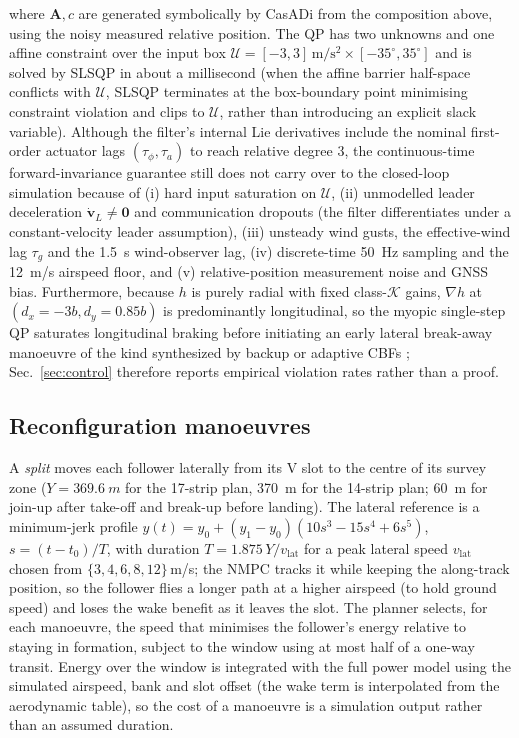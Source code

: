 where $\mathbf A,c$ are generated symbolically by CasADi from the composition above, using the noisy measured relative position. The QP has two unknowns and one affine constraint over the input box $\mathcal U=[-3,3]\,\mathrm{m/s^2}\times[-35^\circ,35^\circ]$ and is solved by SLSQP in about a millisecond (when the affine barrier half-space conflicts with $\mathcal U$, SLSQP terminates at the box-boundary point minimising constraint violation and clips to $\mathcal U$, rather than introducing an explicit slack variable). Although the filter's internal Lie derivatives include the nominal first-order actuator lags $(\tau_\phi,\tau_a)$ to reach relative degree $3$, the continuous-time forward-invariance guarantee still does not carry over to the closed-loop simulation because of (i) hard input saturation on $\mathcal U$, (ii) unmodelled leader deceleration $\dot{\mathbf v}_L\ne\mathbf 0$ and communication dropouts (the filter differentiates under a constant-velocity leader assumption), (iii) unsteady wind gusts, the effective-wind lag $\tau_g$ and the \SI{1.5}{s} wind-observer lag, (iv) discrete-time \SI{50}{Hz} sampling and the \SI{12}{m/s} airspeed floor, and (v) relative-position measurement noise and GNSS bias. Furthermore, because $h$ is purely radial with fixed class-$\mathcal K$ gains, $\nabla h$ at $(d_x=-3b,d_y=0.85b)$ is predominantly longitudinal, so the myopic single-step QP saturates longitudinal braking before initiating an early lateral break-away manoeuvre of the kind synthesized by backup or adaptive CBFs \cite{chen2021backup,xiao2021ada,molnar2025}; Sec.~\ref{sec:control} therefore reports empirical violation rates rather than a proof.

\subsection{Reconfiguration manoeuvres}\label{sec:reconfdesign}
A \emph{split} moves each follower laterally from its V slot to the centre of its survey zone ($Y=\SI{369.6}{m}$ for the 17-strip plan, \SI{370}{m} for the 14-strip plan; \SI{60}{m} for join-up after take-off and break-up before landing). The lateral reference is a minimum-jerk profile $y(t)=y_0+(y_1-y_0)(10s^3-15s^4+6s^5)$, $s=(t-t_0)/T$, with duration $T=1.875\,Y/v_{\mathrm{lat}}$ for a peak lateral speed $v_{\mathrm{lat}}$ chosen from $\{3,4,6,8,12\}$\,m/s; the NMPC tracks it while keeping the along-track position, so the follower flies a longer path at a higher airspeed (to hold ground speed) and loses the wake benefit as it leaves the slot. The planner selects, for each manoeuvre, the speed that minimises the follower's energy relative to staying in formation, subject to the window using at most half of a one-way transit. Energy over the window is integrated with the full power model using the simulated airspeed, bank and slot offset (the wake term is interpolated from the aerodynamic table), so the cost of a manoeuvre is a simulation output rather than an assumed duration.

